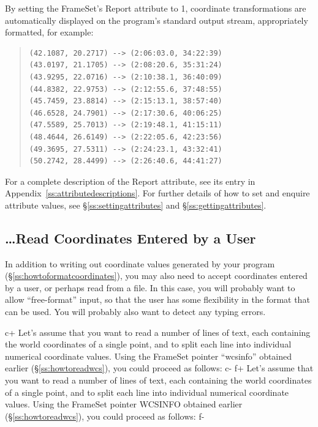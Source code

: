 \documentclass[twoside,11pt]{article}
\newcommand{\appref}[1]{Appendix~\ref{#1}}
\newcommand{\secref}[1]{\S\ref{#1}}
\newcommand{\appref}[1]{\ref{#1}}
\newcommand{\secref}[1]{\ref{#1}}
\begin{document}
By setting the FrameSet's Report attribute to 1, coordinate
transformations are automatically displayed on the program's standard
output stream, appropriately formatted, for example:

\begin{quote}
\begin{verbatim}
(42.1087, 20.2717) --> (2:06:03.0, 34:22:39)
(43.0197, 21.1705) --> (2:08:20.6, 35:31:24)
(43.9295, 22.0716) --> (2:10:38.1, 36:40:09)
(44.8382, 22.9753) --> (2:12:55.6, 37:48:55)
(45.7459, 23.8814) --> (2:15:13.1, 38:57:40)
(46.6528, 24.7901) --> (2:17:30.6, 40:06:25)
(47.5589, 25.7013) --> (2:19:48.1, 41:15:11)
(48.4644, 26.6149) --> (2:22:05.6, 42:23:56)
(49.3695, 27.5311) --> (2:24:23.1, 43:32:41)
(50.2742, 28.4499) --> (2:26:40.6, 44:41:27)
\end{verbatim}
\end{quote}

For a complete description of the Report attribute, see its entry in
\appref{ss:attributedescriptions}.  For further details of how to set
and enquire attribute values, see \secref{ss:settingattributes} and
\secref{ss:gettingattributes}.

\subsection{\ldots Read Coordinates Entered by a User}

In addition to writing out coordinate values generated by your program
(\secref{ss:howtoformatcoordinates}), you may also need to accept
coordinates entered by a user, or perhaps read from a file. In this
case, you will probably want to allow ``free-format'' input, so that
the user has some flexibility in the format that can be used. You will
probably also want to detect any typing errors.

c+
Let's assume that you want to read a number of lines of text, each
containing the world coordinates of a single point, and to split each
line into individual numerical coordinate values. Using the FrameSet
pointer ``wcsinfo'' obtained earlier (\secref{ss:howtoreadwcs}), you
could proceed as follows:
c-
f+
Let's assume that you want to read a number of lines of text, each
containing the world coordinates of a single point, and to split each
line into individual numerical coordinate values. Using the FrameSet
pointer WCSINFO obtained earlier (\secref{ss:howtoreadwcs}), you could
proceed as follows:
f-
\end{document}
